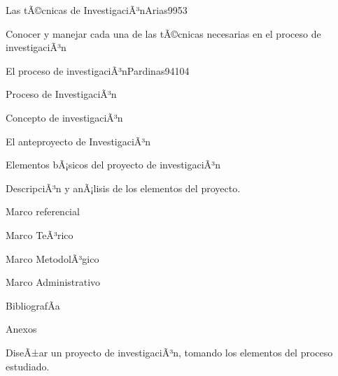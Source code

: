 \begin{syllabus}
\begin{unit}{Las tÃ©cnicas de InvestigaciÃ³n}{Arias99}{5}{3}
   \begin{unitgoals}
      \item Conocer y manejar cada una de las tÃ©cnicas necesarias en el proceso de investigaciÃ³n
   \end{unitgoals}
\end{unit}

\begin{unit}{El proceso de investigaciÃ³n}{Pardinas94}{10}{4}
   \begin{topics}
      \item Proceso de InvestigaciÃ³n
	\item Concepto de investigaciÃ³n
	\item El anteproyecto de InvestigaciÃ³n 
	\item Elementos bÃ¡sicos del proyecto de investigaciÃ³n
	\item DescripciÃ³n y anÃ¡lisis de los elementos del proyecto.
	\item Marco referencial
	\item Marco TeÃ³rico
	\item Marco MetodolÃ³gico
	\item Marco Administrativo
	\item BibliografÃ­a 
	\item Anexos
   \end{topics}

   \begin{unitgoals}
      \item DiseÃ±ar un proyecto de investigaciÃ³n, tomando los elementos del proceso estudiado.
   \end{unitgoals}
\end{unit}

\begin{coursebibliography}
\end{coursebibliography}
\end{syllabus}

